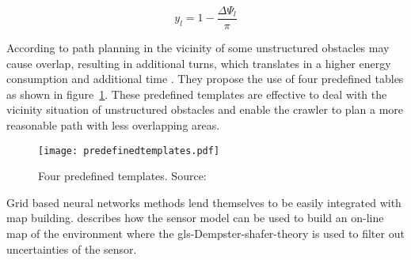 \begin{equation}
    \label{eq:movementfucntion}
    y_l = 1 - \frac{\Delta \varPsi_l}{\pi}
\end{equation}

According to \citet{yan_complete_2012} path planning in the vicinity of some unstructured obstacles may cause overlap,
resulting in additional turns, which translates in a higher energy consumption and additional time
\cite{lee_smooth_2011}\cite{algabri_comparative_2015}\cite{mei_energy-efficient_2004}. They propose the use of four
predefined tables as shown in figure~\ref{fig:fourtemp}. These predefined templates are effective to deal with the
vicinity situation of unstructured obstacles and enable the crawler to plan a more reasonable path with less
overlapping areas.

\begin{figure}
    \begin{center}
        \texttt{[image: predefinedtemplates.pdf]}
    \end{center}
    \caption{Four predefined templates. Source: \citet{yan_complete_2012}}\label{fig:fourtemp}
\end{figure}

Grid based neural networks methods lend themselves to be easily integrated with map building. \citet{yan_complete_2012}
describes how the sensor model can be used to build an on-line map of the environment where the \gls{gls-Dempster-shafer-theory} is used to filter out uncertainties of the sensor.

